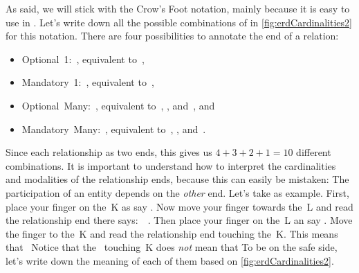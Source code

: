 As said, we will stick with the Crow's Foot notation, mainly because it is easy to use in \yEd.
Let's write down all the possible combinations of  in \cref{fig:erdCardinalities2} for this notation.
There are four possibilities to annotate the end of a relation:%
\begin{itemize}%
\item Optional~1:~\crowsFootOptionalOne, equivalent to~,%
\item Mandatory~1:~\crowsFootMandatoryOne, equivalent to~,%
\item Optional~Many:~\crowsFootOptionalMany, equivalent to~, , and~, and%
\item Mandatory~Many:~\crowsFootMandatoryMany, equivalent to~, , and~.%
\end{itemize}%
%
Since each relationship as two ends, this gives us $4+3+2+1=10$ different combinations.
It is important to understand how to interpret the cardinalities and modalities of the relationship ends, because this can easily be mistaken:
The participation of an entity depends on the \emph{other} end.
Let's take  as example.
First, place your finger on the~K as say .
Now move your finger towards the~L and read the relationship end there says:~~\cite{SE:DA:2016HDIRENCFTCTNL}.
Then place your finger on the~L an say .
Move the finger to the~K and read the relationship end touching the~K.
This means that~
Notice that the \crowsFootMandatoryOne\ touching~K does \emph{not} mean that 
To be on the safe side, let's write down the meaning of each of them based on \cref{fig:erdCardinalities2}.%
%
